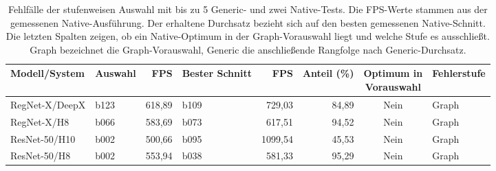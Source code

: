 \begin{table}[t]
\centering\small
\caption{Fehlfälle der stufenweisen Auswahl mit bis zu 5 Generic- und zwei Native-Tests. Die FPS-Werte stammen aus der gemessenen Native-Ausführung. Der erhaltene Durchsatz bezieht sich auf den besten gemessenen Native-Schnitt. Die letzten Spalten zeigen, ob ein Native-Optimum in der Graph-Vorauswahl liegt und welche Stufe es ausschließt. Graph bezeichnet die Graph-Vorauswahl, Generic die anschließende Rangfolge nach Generic-Durchsatz.}
\label{tab:staged-failures-5}
\setlength{\tabcolsep}{3pt}
\begin{tabular*}{\textwidth}{@{\extracolsep{\fill}}llrlrrcl@{}}
\toprule
Modell/System & Auswahl & FPS & Bester Schnitt & FPS & Anteil (\%) & \shortstack{Optimum in\\Vorauswahl} & Fehlerstufe \\
\midrule
RegNet-X/DeepX & b123 & 618,89 & b109 & 729,03 & 84,89 & Nein & Graph\\
RegNet-X/H8 & b066 & 583,69 & b073 & 617,51 & 94,52 & Nein & Graph\\
ResNet-50/H10 & b002 & 500,66 & b095 & 1099,54 & 45,53 & Nein & Graph\\
ResNet-50/H8 & b002 & 553,94 & b038 & 581,33 & 95,29 & Nein & Graph\\
\bottomrule
\end{tabular*}
\end{table}
